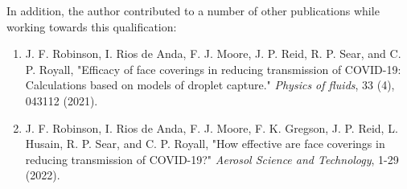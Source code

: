 \noindent In addition, the author contributed to a number of other publications while working towards this qualification:

\begin{enumerate}
	\item J. F. Robinson, I. Rios de Anda, F. J. Moore, J. P. Reid, R. P. Sear, and C. P. Royall, "Efficacy of face coverings in reducing transmission of COVID-19: Calculations based on models of droplet capture." \textit{Physics of fluids},  33 (4), 043112 (2021).
	\item J. F. Robinson, I. Rios de Anda, F. J. Moore, F. K. Gregson, J. P. Reid, L. Husain, R. P. Sear, and C. P. Royall, "How effective are face coverings in reducing transmission of COVID-19?" \textit{Aerosol Science and Technology}, 1-29  (2022).
\end{enumerate}